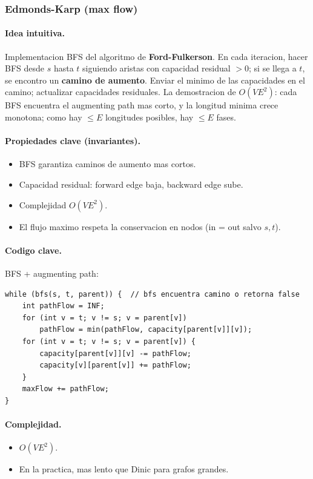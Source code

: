 ﻿\subsubsection{Edmonds-Karp (max flow)}

\paragraph{Idea intuitiva.}
Implementacion BFS del algoritmo de \textbf{Ford-Fulkerson}. En cada iteracion, hacer BFS desde $s$ hasta $t$ siguiendo aristas con capacidad residual $> 0$; si se llega a $t$, se encontro un \textbf{camino de aumento}. Enviar el minimo de las capacidades en el camino; actualizar capacidades residuales. La demostracion de $O(VE^2)$: cada BFS encuentra el augmenting path mas corto, y la longitud minima crece monotona; como hay $\le E$ longitudes posibles, hay $\le E$ fases.

\paragraph{Propiedades clave (invariantes).}
\begin{itemize}\setlength\itemsep{0pt}
	\item BFS garantiza caminos de aumento mas cortos.
	\item Capacidad residual: forward edge baja, backward edge sube.
	\item Complejidad $O(VE^2)$.
	\item El flujo maximo respeta la conservacion en nodos (in = out salvo $s, t$).
\end{itemize}

\paragraph{Codigo clave.}
BFS + augmenting path:
\begin{verbatim}
while (bfs(s, t, parent)) {  // bfs encuentra camino o retorna false
    int pathFlow = INF;
    for (int v = t; v != s; v = parent[v])
        pathFlow = min(pathFlow, capacity[parent[v]][v]);
    for (int v = t; v != s; v = parent[v]) {
        capacity[parent[v]][v] -= pathFlow;
        capacity[v][parent[v]] += pathFlow;
    }
    maxFlow += pathFlow;
}
\end{verbatim}

\paragraph{Complejidad.}
\begin{itemize}\setlength\itemsep{0pt}
	\item $O(VE^2)$.
	\item En la practica, mas lento que Dinic para grafos grandes.
\end{itemize}

